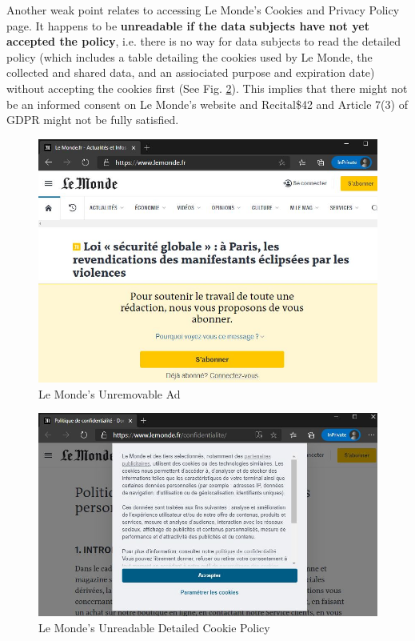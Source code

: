 \documentclass[twocolumn, letterpaper]{scrartcl}
\begin{document}
    	Another weak point relates to accessing Le Monde's Cookies and Privacy Policy page\cite{LM2}. It happens to be \textbf{unreadable if the data subjects have not yet accepted the policy}, i.e. there is no way for data subjects to read the detailed policy (which includes a table detailing the cookies used by Le Monde, the collected and shared data, and an assiociated purpose and expiration date) without accepting the cookies first (See Fig. \ref{fig:f}). This implies that there might not be an informed consent on Le Monde's website and Recital\$42 and Article 7(3) of GDPR might not be fully satisfied. 
        
        \begin{figure}[tbp]
            \includegraphics[width=0.95\linewidth]{lm_sub.JPG}
            \caption{Le Monde's Unremovable Ad \label{fig:e}}
        \end{figure}
        
        \begin{figure}[tbp]	
            \includegraphics[width=0.95\linewidth]{lm_policy.JPG}
            \caption{Le Monde's Unreadable Detailed Cookie Policy\label{fig:f}}
        \end{figure}
        
\end{document}

